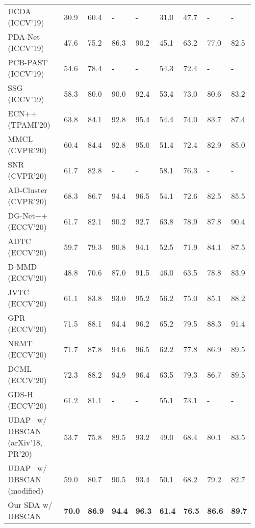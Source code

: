 \documentclass[journal]{IEEEtran}
\begin{document}
\begin{table*}[t]
\begin{center}
\begin{tabular}{P{5cm}|C{1cm}C{1cm}C{1cm}C{1cm}|C{1cm}C{1cm}C{1cm}C{1cm}}
    UCDA~\cite{qi2019novel} (ICCV'19) & 30.9 & 60.4 & - & - & 31.0 & 47.7 & - & - \\
    PDA-Net~\cite{li2019cross} (ICCV'19) & 47.6 & 75.2 & 86.3 & 90.2 & 45.1 & 63.2 & 77.0 & 82.5 \\
PCB-PAST~\cite{zhang2019self} (ICCV'19) & 54.6 & 78.4 & - & - & 54.3 & 72.4 & - & - \\
    SSG~\cite{yang2019selfsimilarity} (ICCV'19) & 58.3 & 80.0 & 90.0 & 92.4 & 53.4 & 73.0 & 80.6 & 83.2 \\
ECN++~\cite{zhong2020learning} (TPAMI'20) & 63.8 & 84.1 & 92.8 & 95.4 & 54.4 & 74.0 & 83.7 & 87.4 \\
   MMCL~\cite{wang2020unsupervised} (CVPR'20) & 60.4 & 84.4 & 92.8 & 95.0 & 51.4 & 72.4 & 82.9 & 85.0 \\
   SNR~\cite{jin2020style} (CVPR'20) & 61.7 & 82.8 & - & - & 58.1 & 76.3 & - & - \\
  AD-Cluster~\cite{zhai2020ad} (CVPR'20) & 68.3 & 86.7 & 94.4 & 96.5 & 54.1 & 72.6 & 82.5 & 85.5 \\
  DG-Net++~\cite{zou2020joint} (ECCV'20) & 61.7 & 82.1 & 90.2 & 92.7 & 63.8 &  78.9 & 87.8 & 90.4 \\
  ADTC \cite{jiattention}  (ECCV'20) &  59.7 & 79.3 & 90.8 & 94.1 & 52.5 & 71.9 & 84.1 & 87.5 \\
  D-MMD \cite{mekhazni2020unsupervised} (ECCV'20) & 48.8 & 70.6 & 87.0 & 91.5 &46.0 & 63.5 & 78.8  & 83.9 \\
  JVTC \cite{li2020joint} (ECCV'20) &   61.1 & 83.8 & 93.0 & 95.2 &  56.2 & 75.0 & 85.1 & 88.2 \\
  GPR \cite{luogeneralizing} (ECCV'20) & {71.5}& {88.1} &  {94.4} & {96.2} &  {65.2} & {79.5} & {88.3} & {91.4} \\
  NRMT \cite{zhao2020unsupervised} (ECCV'20) &  {71.7} & {87.8} & {94.6} & {96.5} & 62.2 & 77.8 & 86.9 & 89.5 \\
  DCML \cite{chendeep} (ECCV'20) & {72.3} & {88.2} & {94.9} & {96.4} & 63.5 & 79.3 & 86.7 & 89.5 \\
  GDS-H \cite{jin2020global} (ECCV'20) & 61.2 & 81.1 & - & - & 55.1 & 73.1 & - & -\\
\hline
    UDAP~\cite{song2018unsupervised} w/ {DBSCAN} (arXiv'18, PR'20) & 53.7 & 75.8 & 89.5 & 93.2 & 49.0 & 68.4 & 80.1 & 83.5 \\
     {UDAP~\cite{song2018unsupervised} w/ {DBSCAN} (modified)} & 59.0 & 80.7 & 90.5 & 93.4 & 50.1 & 68.2 & 79.2 & 82.7 \\
	Our SDA w/ {DBSCAN} & \textbf{70.0} & \textbf{86.9} & \textbf{94.4} & \textbf{96.3} & \textbf{61.4} & \textbf{76.5} & \textbf{86.6} & \textbf{89.7} \\

\end{tabular}
\end{center}
\end{table*}
\end{document}
